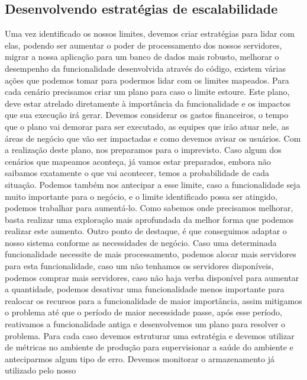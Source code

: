     \subsection{Desenvolvendo estratégias de escalabilidade}
      Uma vez identificado os nossos limites, devemos criar estratégias para lidar
      com elas, podendo ser aumentar o poder de processamento dos nossos servidores,
      migrar a nossa aplicação para um banco de dados mais robusto, melhorar o
      desempenho da funcionalidade desenvolvida através do código, existem
      várias ações que podemos tomar para podermos lidar com os limites mapeados.
      Para cada cenário precisamos criar um plano para caso o limite estoure. Este
      plano, deve estar atrelado diretamente à importância da funcionalidade e os
      impactos que sua execução irá gerar. Devemos considerar os gastos financeiros,
      o tempo que o plano vai demorar para ser executado, as equipes que irão atuar
      nele, as áreas de negócio que vão ser impactadas e como devemos avisar os
      usuários. Com a realização deste plano, nos preparamos para o imprevisto.
      Caso algum dos cenários que mapeamos aconteça, já vamos estar preparados,
      embora não saibamos exatamente o que vai acontecer, temos a probabilidade de
      cada situação. Podemos também nos antecipar a esse limite, caso a funcionalidade
      seja muito importante para o negócio, e o limite identificado possa ser atingido,
      podemos trabalhar para aumentá-lo. Como sabemos onde precisamos melhorar,
      basta realizar uma exploração mais aprofundada da melhor forma que podemos
      realizar este aumento. Outro ponto de destaque, é que conseguimos adaptar o
      nosso sistema conforme as necessidades de negócio. Caso uma determinada
      funcionalidade necessite de mais processamento, podemos alocar mais servidores
      para esta funcionalidade, caso um não tenhamos os servidores disponíveis,
      podemos comprar mais servidores, caso não haja verba disponível para aumentar
      a quantidade, podemos desativar uma funcionalidade menos importante para
      realocar os recursos para a funcionalidade de maior importância, assim
      mitigamos o problema até que o período de maior necessidade passe, após esse
      período, reativamos a funcionalidade antiga e desenvolvemos um plano para
      resolver o problema. \newline
      Para cada caso devemos estruturar uma estratégia e devemos utilizar de métricas
      no ambiente de produção para supervisionar a saúde do ambiente e anteciparmos
      algum tipo de erro. Devemos monitorar o armazenamento já utilizado pelo nosso
